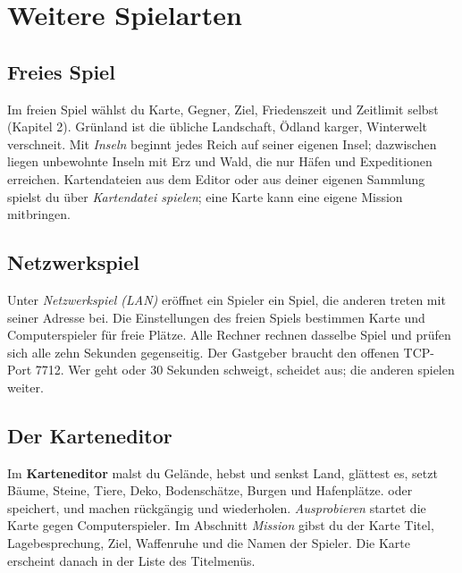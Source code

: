 \documentclass[a4paper,11pt,oneside,DIV=12,headings=small,toc=chapterentrydotfill]{scrbook}
\begin{document}
\chapter{Weitere Spielarten}

\section{Freies Spiel}
Im freien Spiel wählst du Karte, Gegner, Ziel, Friedenszeit und Zeitlimit selbst (Kapitel 2). Grünland ist
die übliche Landschaft, Ödland karger, Winterwelt verschneit. Mit \emph{Inseln} beginnt jedes Reich auf seiner
eigenen Insel; dazwischen liegen unbewohnte Inseln mit Erz und Wald, die nur Häfen und Expeditionen erreichen. Kartendateien aus dem Editor oder aus deiner
eigenen Sammlung spielst du über \emph{Kartendatei spielen}; eine Karte kann eine eigene Mission mitbringen.

\section{Netzwerkspiel}
Unter \emph{Netzwerkspiel (LAN)} eröffnet ein Spieler ein Spiel, die anderen treten mit seiner Adresse bei.
Die Einstellungen des freien Spiels bestimmen Karte und Computerspieler für freie Plätze. Alle Rechner rechnen
dasselbe Spiel und prüfen sich alle zehn Sekunden gegenseitig. Der Gastgeber braucht den offenen TCP-Port 7712.
Wer geht oder 30 Sekunden schweigt, scheidet aus; die anderen spielen weiter.

\section{Der Karteneditor}
Im \textbf{Karteneditor} malst du Gelände, hebst und senkst Land, glättest es, setzt Bäume, Steine, Tiere,
Deko, Bodenschätze, Burgen und Hafenplätze.  oder  speichert,  und
 machen rückgängig und wiederholen. \emph{Ausprobieren} startet die Karte gegen Computerspieler.
Im Abschnitt \emph{Mission} gibst du der Karte Titel, Lagebesprechung, Ziel, Waffenruhe und die Namen der
Spieler. Die Karte erscheint danach in der Liste des Titelmenüs.

\end{document}
